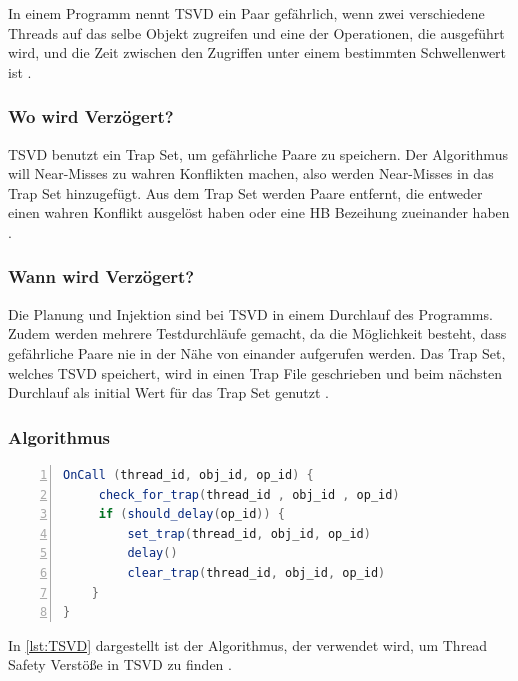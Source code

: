 In einem Programm nennt \acs{TSVD} ein Paar gefährlich, wenn zwei verschiedene Threads auf das selbe Objekt zugreifen und eine der Operationen, die ausgeführt wird, und die Zeit zwischen den Zugriffen unter einem bestimmten Schwellenwert ist \cite[vgl.][168]{li_efficient_2019}.  

\subsubsection*{Wo wird Verzögert?}

\acs{TSVD} benutzt ein Trap Set, um gefährliche Paare zu speichern. Der Algorithmus will Near-Misses zu wahren Konflikten machen, also werden Near-Misses in das Trap Set hinzugefügt. Aus dem Trap Set werden Paare entfernt, die entweder einen wahren Konflikt ausgelöst haben oder eine \acs{HB} Bezeihung zueinander haben \cite[vgl.][167]{li_efficient_2019}.

\subsubsection*{Wann wird Verzögert?}

Die Planung und Injektion sind bei \acs{TSVD} in einem Durchlauf des Programms. Zudem werden mehrere Testdurchläufe gemacht, da die Möglichkeit besteht, dass gefährliche Paare nie in der Nähe von einander aufgerufen werden. Das Trap Set, welches \acs{TSVD} speichert, wird in einen Trap File geschrieben und beim nächsten Durchlauf als initial Wert für das Trap Set genutzt \cite[vgl.][169]{li_efficient_2019}.  


\subsubsection*{Algorithmus}

\begin{lstlisting}[language=Java,frame=tb,caption={\acs{TSVD} Trap Mechanism}, label={lst:TSVD}, numbers=left, stepnumber=1]
OnCall (thread_id, obj_id, op_id) { 
     check_for_trap(thread_id , obj_id , op_id) 
     if (should_delay(op_id)) {
         set_trap(thread_id, obj_id, op_id)
         delay()
         clear_trap(thread_id, obj_id, op_id)
    }
}
\end{lstlisting}

In \ref{lst:TSVD} dargestellt ist der Algorithmus, der verwendet wird, um Thread Safety Verstöße in \acs{TSVD} zu finden \cite[Figure 5,][166]{li_efficient_2019}. 

